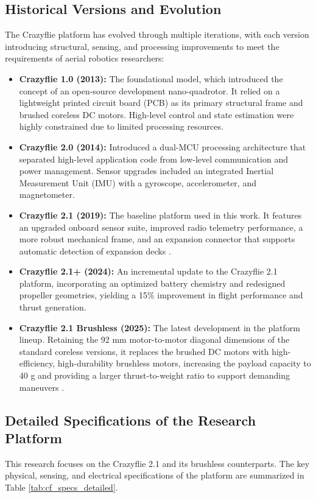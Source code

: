 \subsection{Historical Versions and Evolution}
The Crazyflie platform has evolved through multiple iterations, with each version introducing structural, sensing, and processing improvements to meet the requirements of aerial robotics researchers:
\begin{itemize}
    \item \textbf{Crazyflie 1.0 (2013):} The foundational model, which introduced the concept of an open-source development nano-quadrotor. It relied on a lightweight printed circuit board (PCB) as its primary structural frame and brushed coreless DC motors. High-level control and state estimation were highly constrained due to limited processing resources.
    \item \textbf{Crazyflie 2.0 (2014):} Introduced a dual-MCU processing architecture that separated high-level application code from low-level communication and power management. Sensor upgrades included an integrated Inertial Measurement Unit (IMU) with a gyroscope, accelerometer, and magnetometer.
    \item \textbf{Crazyflie 2.1 (2019):} The baseline platform used in this work. It features an upgraded onboard sensor suite, improved radio telemetry performance, a more robust mechanical frame, and an expansion connector that supports automatic detection of expansion decks \cite{ref_40}.
    \item \textbf{Crazyflie 2.1+ (2024):} An incremental update to the Crazyflie 2.1 platform, incorporating an optimized battery chemistry and redesigned propeller geometries, yielding a 15\% improvement in flight performance and thrust generation.
    \item \textbf{Crazyflie 2.1 Brushless (2025):} The latest development in the platform lineup. Retaining the 92 mm motor-to-motor diagonal dimensions of the standard coreless versions, it replaces the brushed DC motors with high-efficiency, high-durability brushless motors, increasing the payload capacity to 40 g and providing a larger thrust-to-weight ratio to support demanding maneuvers \cite{ref_53}.
\end{itemize}

\subsection{Detailed Specifications of the Research Platform}
This research focuses on the Crazyflie 2.1 and its brushless counterparts. The key physical, sensing, and electrical specifications of the platform are summarized in Table \ref{tab:cf_specs_detailed}.

